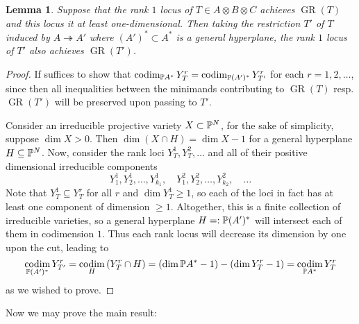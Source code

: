 \documentclass[a4paper,10pt]{article}
\def\zav#1{\left(#1\right)}
\let\surjto\twoheadrightarrow
\DeclareMathOperator{\codim}{codim}
\DeclareMathOperator{\GR}{GR}
\newtheorem{lemma}[theorem]{Lemma}
\theoremstyle{definition}
\theoremstyle{remark}
\begin{document}
\begin{lemma}
    \label{lem:cuttingdown}
    Suppose that the rank $1$ locus of $T\in A\otimes B\otimes C$ achieves $\GR(T)$ and this locus it at least one-dimensional. Then taking the restriction $T'$ of $T$ induced by $A\surjto A'$ where $(A')^*\subset A^*$ is a general hyperplane, the rank $1$ locus of $T'$ also achieves $\GR(T')$.
\end{lemma}
\begin{proof}
    If suffices to show that $\codim_{\pe A^*}Y^r_{T} = \codim_{\pe (A')^*}Y^r_{T'}$ for each $r=1,2,\dots$, since then all inequalities between the minimands contributing to $\GR(T)$ resp. $\GR(T')$ will be preserved upon passing to $T'$.

    Consider an irreducible projective variety $X\subset\pe^N$, for the sake of simplicity, suppose $\dim X>0$. Then $\dim(X\cap H)=\dim X-1$ for a general hyperplane $H\subseteq \pe^N$. Now, consider the rank loci $Y^1_T,Y^2_T,\dots$ and all of their positive dimensional irreducible components
    \[
        Y^1_1,Y^1_2,\dots,Y^1_{k_1},\quad Y^2_1,Y^2_2,\dots,Y^2_{k_2},\quad \dots
    \]
    Note that $Y^1_T\subseteq Y^r_T$ for all $r$ and $\dim Y^1_T\geq1$, so each of the loci in fact has at least one component of dimension $\geq1$.
    Altogether, this is a finite collection of irreducible varieties, so a general hyperplane $H=:\pe(A')^*$ will intersect each of them in codimension $1$. Thus each rank locus will decrease its dimension by one upon the cut, leading to
    \[
        \codim_{\pe (A')^*}Y^r_{T'} = \codim_{H}\zav{Y^r_T\cap H} = (\dim\pe A^*-1) - \zav{\dim Y^r_T-1} = \codim_{\pe A^*}Y^r_T
    \]
    as we wished to prove.
\end{proof}


Now we may prove the main result:
\end{document}
